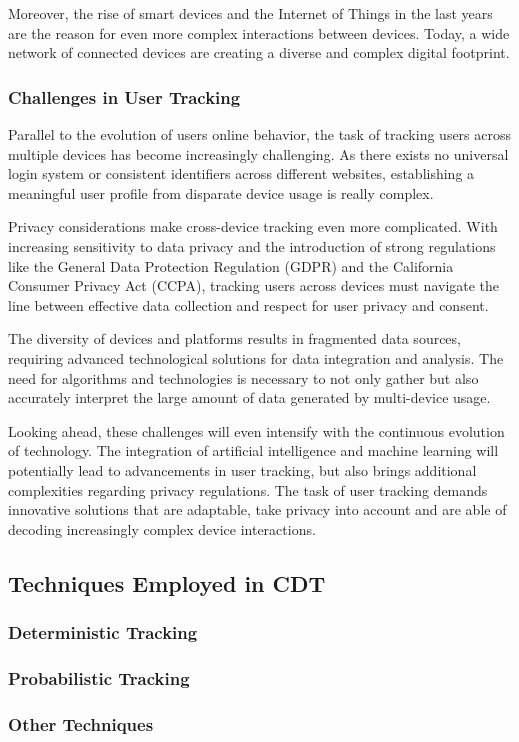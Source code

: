 Moreover, the rise of smart devices and the Internet of Things in the last years are the reason for  even more complex interactions between devices. Today, a wide network of connected devices are creating a diverse and complex digital footprint.

\subsubsection{Challenges in User Tracking}
Parallel to the evolution of users online behavior, the task of tracking users across multiple devices has become increasingly challenging. As there exists no universal login system or consistent identifiers across different websites, establishing a meaningful user profile from disparate device usage is really complex.

Privacy considerations make cross-device tracking even more complicated. With increasing sensitivity to data privacy and the introduction of strong regulations like the General Data Protection Regulation (GDPR) and the California Consumer Privacy Act (CCPA), tracking users across devices must navigate the line between effective data collection and respect for user privacy and consent.

The diversity of devices and platforms results in fragmented data sources, requiring advanced technological solutions for data integration and analysis. The need for algorithms and technologies is necessary to not only gather but also accurately interpret the large amount of data generated by multi-device usage.

Looking ahead, these challenges will even intensify with the continuous evolution of technology. The integration of artificial intelligence and machine learning will potentially lead to advancements in user tracking, but also brings additional complexities regarding privacy regulations. The task of user tracking demands innovative solutions that are adaptable, take privacy into account and are able of decoding increasingly complex device interactions.

\subsection{Techniques Employed in CDT}
\subsubsection{Deterministic Tracking}
\subsubsection{Probabilistic Tracking}
\subsubsection{Other Techniques}